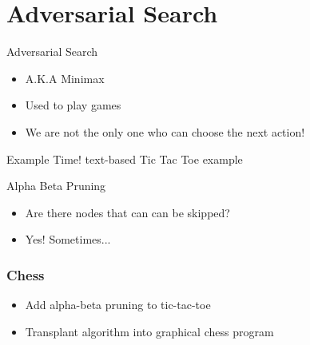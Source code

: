 \documentclass[presentation]{beamer}
\begin{document}
\section{Adversarial Search} 
\begin{frame}{Adversarial Search}
  \begin{itemize}
  \item A.K.A Minimax
  \item Used to play games
  \item We are not the only one who can choose the next action!
  \end{itemize}
\end{frame}
\begin{frame}{Example Time!}
  text-based Tic Tac Toe example
\end{frame}
\begin{frame}{Alpha Beta Pruning}
  \begin{itemize}
  \item Are there nodes that can can be skipped?
  \item<2-> Yes! Sometimes...
  \end{itemize}
\end{frame}
\begin{frame}
  \frametitle{Chess}
  \begin{itemize}
  \item Add alpha-beta pruning to tic-tac-toe
  \item Transplant algorithm into graphical chess program
  \end{itemize}
\end{frame}
\end{document}
